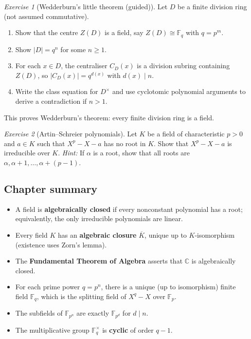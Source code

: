 \documentclass[12pt,a4paper,openany]{book}
\theoremstyle{definition}
\theoremstyle{remark}
\newtheorem{exercise}{Exercise}[chapter]
\newcommand{\C}{\mathbb{C}}
\newcommand{\F}{\mathbb{F}}
\begin{document}
\begin{exercise}[Wedderburn's little theorem (guided)]
\label{exer:wedderburn}
Let $D$ be a finite division ring (not assumed commutative).
\begin{enumerate}[label=(\alph*)]
  \item Show that the centre $Z(D)$ is a field, say $Z(D) \cong
    \F_q$ with $q = p^m$.
  \item Show $|D| = q^n$ for some $n \ge 1$.
  \item For each $x \in D$, the centraliser $C_D(x)$ is a division
    subring containing $Z(D)$, so $|C_D(x)| = q^{d(x)}$ with
    $d(x) \mid n$.
  \item Write the class equation for $D^{\times}$ and use cyclotomic
    polynomial arguments to derive a contradiction if $n > 1$.
\end{enumerate}
This proves Wedderburn's theorem: every finite division ring is a
field.
\end{exercise}

\begin{exercise}[Artin--Schreier polynomials]
\label{exer:artin-schreier}
Let $K$ be a field of characteristic $p > 0$ and $a \in K$ such that
$X^p - X - a$ has no root in $K$. Show that $X^p - X - a$ is
irreducible over $K$.
\textit{Hint:} If $\alpha$ is a root, show that all roots are
$\alpha, \alpha+1, \dots, \alpha + (p-1)$.
\end{exercise}

\subsection*{Chapter summary}

\begin{itemize}[leftmargin=2em]
  \item A field is \textbf{algebraically closed} if every nonconstant
    polynomial has a root; equivalently, the only irreducible
    polynomials are linear.
  \item Every field $K$ has an \textbf{algebraic closure}
    $\overline{K}$, unique up to $K$-isomorphism (existence uses
    Zorn's lemma).
  \item The \textbf{Fundamental Theorem of Algebra} asserts that $\C$
    is algebraically closed.
  \item For each prime power $q = p^n$, there is a unique (up to
    isomorphism) finite field $\F_q$, which is the splitting field of
    $X^q - X$ over $\F_p$.
  \item The subfields of $\F_{p^n}$ are exactly $\F_{p^d}$ for
    $d \mid n$.
  \item The multiplicative group $\F_q^{\times}$ is \textbf{cyclic} of
    order $q - 1$.
\end{itemize}
\end{document}
